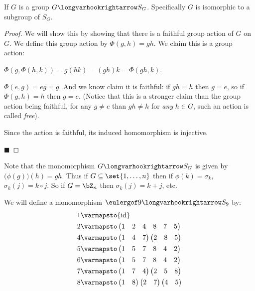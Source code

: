 \documentclass[10pt]{article}
\def\pmat#1{\begin{pmatrix} #1 \end{pmatrix}}
\let\mmorph=\longvarhookrightarrow
\begin{document}
\begin{thrm*}

    If $G$ is a group $G\mmorph S_G$.
    Specifically $G$ is isomorphic to a subgroup of $S_G$.

\end{thrm*}

\begin{proof}

    We will show this by showing that there is a faithful group action of $G$ on $G$.
    We define this group action by $\Phi(g,h)=gh$.
    We claim this is a group action:
    \benum
        \item $\Phi(g,\Phi(h,k))=g(hk)=(gh)k=\Phi(gh,k)$.
        \item $\Phi(e,g)=eg=g$.
    \eenum
    And we know claim it is faithful: if $gh=h$ then $g=e$, so if $\Phi(g,h)=h$ then $g=e$.
    (Notice that this is a stronger claim than the group action being faithful, for any $g\neq e$ than $gh\neq h$ for \emph{any} $h\in G$, such an action is called \emph{free}).

    Since the action is faithful, its induced homomorphism is injective.

    \hfill$\blacksquare$

\end{proof}

Note that the monomorphism $G\mmorph S_G$ is given by $\bigl(\phi(g)\bigr)(h)=gh$.
Thus if $G\subseteq\set{1,\dots,n}$ then if $\phi(k)=\sigma_k$, $\sigma_k(j)=k\circ j$.
So if $G=\bZ_n$ then $\sigma_k(j)=k+j$, etc.

\begin{exam}

    We will define a monomorphism $\eulergof 9\mmorph S_9$ by:
    \begin{align*}
        1 &\varmapsto {\rm id} \\
        2 &\varmapsto \pmat{1 & 2 & 4 & 8 & 7 & 5} \\
        4 &\varmapsto \pmat{1 & 4 & 7}\pmat{2 & 8 & 5} \\
        5 &\varmapsto \pmat{1 & 5 & 7 & 8 & 4 & 2} \\
        6 &\varmapsto \pmat{1 & 5 & 7 & 8 & 4 & 2} \\
        7 &\varmapsto \pmat{1 & 7 & 4}\pmat{2 & 5 & 8} \\
        8 &\varmapsto \pmat{1 & 8}\pmat{2 & 7}\pmat{4 & 5}
    \end{align*}

\end{exam}
\end{document}
